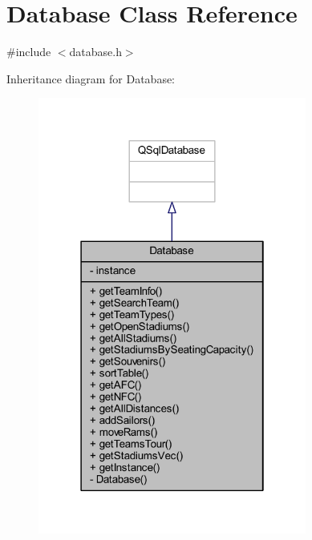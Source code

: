 \hypertarget{class_database}{}\section{Database Class Reference}
\label{class_database}


{\ttfamily \#include $<$database.\+h$>$}



Inheritance diagram for Database\+:
\nopagebreak
\begin{figure}[H]
\begin{center}
\leavevmode
\includegraphics[width=250pt]{class_database__inherit__graph}
\end{center}
\end{figure}


